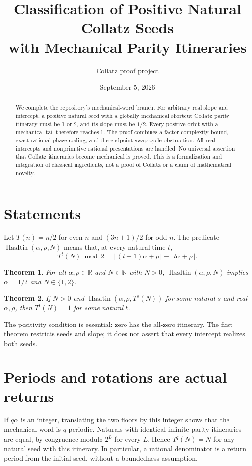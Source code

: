 \documentclass[10pt]{article}
\title{Classification of Positive Natural Collatz Seeds\\with Mechanical Parity Itineraries}
\author{Collatz proof project}
\date{September 5, 2026}
\newtheorem{theorem}{Theorem}
\begin{document}
\maketitle
\begin{abstract}
We complete the repository's mechanical-word branch. For arbitrary real
slope and intercept, a positive natural seed with a globally mechanical
shortcut Collatz parity itinerary must be 1 or 2, and its slope must be
$1/2$. Every positive orbit with a mechanical tail therefore reaches 1.
The proof combines a factor-complexity bound, exact rational phase coding,
and the endpoint-swap cycle obstruction. All real intercepts and
nonprimitive rational presentations are handled. No universal assertion
that Collatz itineraries become mechanical is proved. This is a
formalization and integration of classical ingredients, not a proof of
Collatz or a claim of mathematical novelty.
\end{abstract}

\section{Statements}
Let $T(n)=n/2$ for even $n$ and $(3n+1)/2$ for odd $n$. The predicate
$\operatorname{HasItin}(\alpha,\rho,N)$ means that, at every natural time $t$,
\[
 T^t(N)\bmod2
 =\lfloor(t+1)\alpha+\rho\rfloor-\lfloor t\alpha+\rho\rfloor.
\]
\begin{theorem}
For all $\alpha,\rho\in\mathbb R$ and $N\in\mathbb N$ with $N>0$,
$\operatorname{HasItin}(\alpha,\rho,N)$ implies
$\alpha=1/2$ and $N\in\{1,2\}$.
\end{theorem}
\begin{theorem}
If $N>0$ and $\operatorname{HasItin}(\alpha,\rho,T^s(N))$ for some
natural $s$ and real $\alpha,\rho$, then $T^t(N)=1$ for some natural $t$.
\end{theorem}
The positivity condition is essential: zero has the all-zero itinerary.
The first theorem restricts seeds and slope; it does not assert that every
intercept realizes both seeds.

\section{Periods and rotations are actual returns}
If $q\alpha$ is an integer, translating the two floors by this integer
shows that the mechanical word is $q$-periodic. Naturals with identical
infinite parity itineraries are equal, by congruence modulo $2^L$ for
every $L$. Hence $T^q(N)=N$ for any natural seed with this itinerary.
In particular, a rational denominator is a return period from the initial
seed, without a boundedness assumption.
\end{document}

